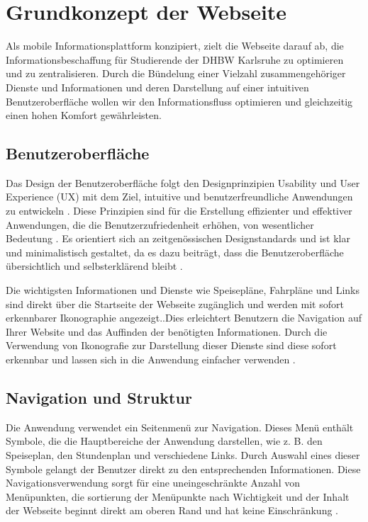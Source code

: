 \newpage
\section{Grundkonzept der Webseite}
Als mobile Informationsplattform konzipiert, zielt die Webseite darauf ab, die Informationsbeschaffung für Studierende der DHBW Karlsruhe zu optimieren und zu zentralisieren. Durch die Bündelung einer Vielzahl zusammengehöriger Dienste und Informationen und deren Darstellung auf einer intuitiven Benutzeroberfläche wollen wir den Informationsfluss optimieren und gleichzeitig einen hohen Komfort gewährleisten.

\subsection{Benutzeroberfläche}
Das Design der Benutzeroberfläche folgt den Designprinzipien Usability und User Experience (UX) mit dem Ziel, intuitive und benutzerfreundliche Anwendungen zu entwickeln \cite{hartmann2017usability}. Diese Prinzipien sind für die Erstellung effizienter und effektiver Anwendungen, die die Benutzerzufriedenheit erhöhen, von wesentlicher Bedeutung \cite{14all}. Es orientiert sich an zeitgenössischen Designstandards und ist klar und minimalistisch gestaltet, da es dazu beiträgt, dass die Benutzeroberfläche übersichtlich und selbsterklärend bleibt \cite{massiveart}.

Die wichtigsten Informationen und Dienste wie Speisepläne, Fahrpläne und Links sind direkt über die Startseite der Webseite zugänglich und werden mit sofort erkennbarer Ikonographie angezeigt..Dies erleichtert Benutzern die Navigation auf Ihrer Website und das Auffinden der benötigten Informationen. Durch die Verwendung von Ikonografie zur Darstellung dieser Dienste sind diese sofort erkennbar und lassen sich in die Anwendung einfacher verwenden \cite{99designs}. 

\subsection{Navigation und Struktur}
Die Anwendung verwendet ein Seitenmenü zur Navigation. Dieses Menü enthält Symbole, die die Hauptbereiche der Anwendung darstellen, wie z. B. den Speiseplan, den Stundenplan und verschiedene Links. Durch Auswahl eines dieser Symbole gelangt der Benutzer direkt zu den entsprechenden Informationen. Diese Navigationsverwendung sorgt für eine uneingeschränkte Anzahl von Menüpunkten, die sortierung der Menüpunkte nach Wichtigkeit und der Inhalt der Webseite beginnt direkt am oberen Rand und hat keine Einschränkung \cite{eology2023}.

